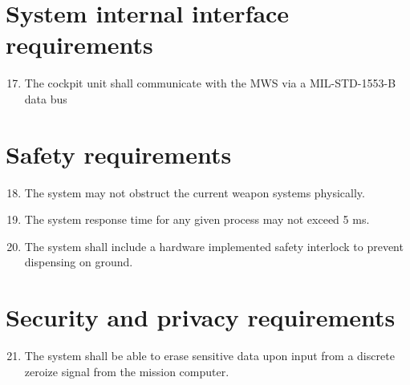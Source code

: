 \documentclass[Main]{subfiles}
\begin{document}
\section{System internal interface requirements}

\begin{enumerate}[{SR}-1]
\setcounter{enumi}{16}
\item The cockpit unit shall communicate with the MWS via a MIL-STD-1553-B data bus\label{SR-17}

\end{enumerate}


\section{Safety requirements}
\begin{enumerate}[{SR}-1.]
\setcounter{enumi}{17}
\item The system may not obstruct the current weapon systems physically.\label{SR-18}

\item The system response time for any given process may not exceed 5 ms.\label{SR-19}

\item The system shall include a hardware implemented safety interlock to prevent dispensing on ground.\label{SR-20}

\end{enumerate}


\section{Security and privacy requirements}

\begin{enumerate}[{SR}-1]
\setcounter{enumi}{20}
\item The system shall be able to erase sensitive data upon input from a discrete zeroize signal from the mission computer.\label{SR-21}

\end{enumerate}
\end{document}
